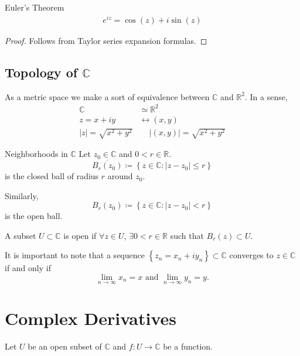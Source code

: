 \documentclass{article}
\begin{document}
\begin{thrm}{Euler's Theorem}{}
\begin{align*}
    e^{iz} = \cos (z) + i\sin (z)  
\end{align*}

\begin{proof}
Follows from Taylor series expansion formulas.
\end{proof}

\end{thrm}

\subsection{Topology of \(\mathbb{C}\)}

As a metric space we make a sort of equivalence between \( \mathbb{C}  \) and \( \mathbb{R}^2  \). In a sense, 
\begin{align*}
    \mathbb{C}& \simeq \mathbb{R} ^2\\
    z = x + iy& \leftrightarrow (x,y)\\
    |z| = \sqrt{x^{2} + y^{2} }& \quad \ |(x, y)| = \sqrt{x^{2} + y^{2} }  
\end{align*}

\begin{exmp}{Neighborhoods in \( \mathbb{C}  \) }{}
Let \( z_0 \in \mathbb{C}  \) and \( 0<r\in \mathbb{R}  \).
\[
    \overline{B_{r} (z_0) }\coloneqq \left\{ z \in \mathbb{C} : |z - z_0| \leq  r \right\}  
\]
is the closed ball of radius \( r \) around \( z_0. \) 

Similarly, 
\[
    B_{r} (z_0) \coloneqq \left\{ z\in \mathbb{C} : |z - z_0| <r \right\} 
\]
is the open ball.

A subset \( U \subset \mathbb{C}  \) is open if \( \forall z \in U \), \( \exists 0<r\in \mathbb{R}  \)  such that \( B_{r} (z) \subset U  \). 
\end{exmp}

It is important to note that a sequence \( \left\{ z_n = x_{n} + iy_{n}  \right\} \subset \mathbb{C}   \)  converges to \( z \in \mathbb{C} \) if and only if 
\[
    \lim_{n \to \infty} x_{n} = x \text{  and  } \lim_{n \to \infty} y_{n} = y.
\]

\section{Complex Derivatives}

Let \( U \) be an open subset of \( \mathbb{C} \) and \( f: U \to \mathbb{C}  \) be a function. 
\end{document}
